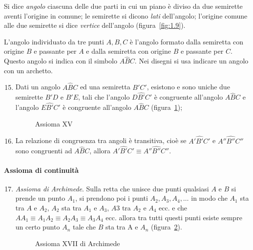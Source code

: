 {\begin{center}
 
\end{center}

\begin{definizione}
Si dice \emph{angolo} ciascuna delle due parti in cui un piano è diviso da due semirette aventi l'origine in comune; le semirette si dicono \emph{lati} dell'angolo; l'origine comune alle due semirette si dice \emph{vertice} dell'angolo (figura~\ref{fig:1.9}).
\end{definizione}
\begin{figure*}[b,t,h]
\centering  
\caption{Le semirette $ r $ e $ s $, aventi l'origine $ V $ comune individuano due regioni del piano dette angolo.}\label{fig:1.9}
\end{figure*}

L'angolo individuato da tre punti $ A, B, C $ è l'angolo formato dalla semiretta con origine $ B $ e passante per $ A $ e dalla semiretta con origine $ B $ e passante per $ C $. Questo angolo si indica con il simbolo $ A\hat{B}C $. Nei disegni si usa indicare un angolo con un archetto.

\begin{enumerate}[label=\Roman{*}.]
\setcounter{enumi}{14}
\item Dati un angolo $A\hat{B}C$ ed una semiretta $ B'C' $, esistono e sono uniche due semirette $ B'D $ e $ B'E $, tali che l'angolo $D\hat{B'}C'$  è congruente all'angolo  $A\hat{B}C$ e l'angolo $E\hat{B'}C'$ è congruente all'angolo $A\hat{B}C$ (figura~\ref{fig:1.10});
\begin{figure}[b,t,h]
 \centering 
 \caption{Assioma XV}\label{fig:1.10}
\end{figure}
\item La relazione di congruenza tra angoli è transitiva, cioè se  $A'\hat{B'}C'$ e  $A''\hat{B''}C''$ sono congruenti ad $A\hat{B}C$, allora  $A'\hat{B'}C' \equiv A''\hat{B''}C''$.
\end{enumerate}

\paragraph{Assioma di continuità}

\begin{enumerate}[label=\Roman{*}.]
\setcounter{enumi}{16}
\item \emph{Assioma di Archimede}. Sulla retta che unisce due punti qualsiasi $ A $ e $ B $ si prende un punto $ A_1 $, si prendono poi i punti $ A_2, A_3, A_4, \ldots $ in modo che $ A_1 $ sta tra $ A $ e $ A_2 $, $ A_2 $ sta tra $ A_1 $ e $ A_3 $, $ A3 $ tra $ A_2 $ e $ A_4 $ ecc. e che  ${AA}_{1}\equiv A_{1}A_{2}\equiv A_{2}A_{3}\equiv A_{3}A_{4}$ ecc. allora tra tutti questi punti esiste sempre un certo punto $ A_n $ tale che $ B $ sta tra A e $ A_n $ (figura~\ref{fig:1.11}).
\begin{figure}[b,t,h]
 \centering 
 \caption{Assioma XVII di Archimede}\label{fig:1.11}
\end{figure}
\end{enumerate}

}
